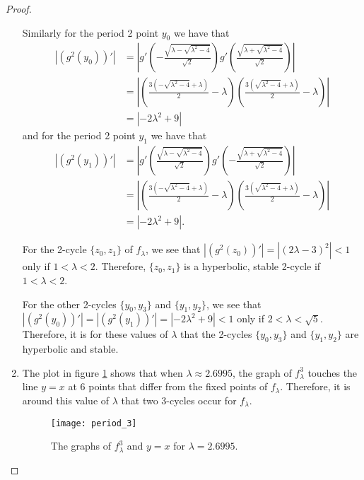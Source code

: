 \begin{proof}
\begin{enumerate}
      Similarly for the period 2 point $y_0$ we have that
      \begin{align*}
        \left|(g^2(y_0))'\right| &= \left|g'\left(-\frac{\sqrt{\lambda - \sqrt{\lambda^2-4}}}{\sqrt{2}}\right)g'\left(\frac{\sqrt{\lambda + \sqrt{\lambda^2-4}}}{\sqrt{2}}\right)\right| \\
        &= \left|\left(\frac{3\left(-\sqrt{\lambda^2 - 4} + \lambda\right)}{2}  - \lambda\right)\left(\frac{3\left(\sqrt{\lambda^2 - 4} + \lambda\right)}{2}  - \lambda\right)\right| \\
        &= \left|-2\lambda^2+9\right|
      \end{align*}
      and for the period 2 point $y_1$ we have that
      \begin{align*}
        \left|(g^2(y_1))'\right| &= \left|g'\left(\frac{\sqrt{\lambda - \sqrt{\lambda^2-4}}}{\sqrt{2}}\right)g'\left(-\frac{\sqrt{\lambda + \sqrt{\lambda^2-4}}}{\sqrt{2}}\right)\right| \\
        &= \left|\left(\frac{3\left(-\sqrt{\lambda^2 - 4} + \lambda\right)}{2}  - \lambda\right)\left(\frac{3\left(\sqrt{\lambda^2 - 4} + \lambda\right)}{2}  - \lambda\right)\right| \\
        &= \left|-2\lambda^2+9\right|.
      \end{align*}

      For the 2-cycle $\{z_0, z_1\}$ of $f_\lambda$,
      we see that $\left|(g^2(z_0))'\right| = \left|(2\lambda - 3)^2\right| < 1$ only if $1 < \lambda < 2$. Therefore, $\{z_0, z_1\}$
      is a hyperbolic, stable 2-cycle if $1 < \lambda < 2$.

      For the other 2-cycles $\{y_0, y_3\}$ and $\{y_1, y_2\}$, we see that
      $\left|(g^2(y_0))'\right| = \left|(g^2(y_1))'\right| = \left|-2\lambda^2 + 9\right| < 1$ only if
      $2 < \lambda < \sqrt{5}$. Therefore, it is for these values of
      $\lambda$ that the 2-cycles $\{y_0, y_3\}$ and $\{y_1, y_2\}$ are hyperbolic and stable.
    \item The plot in figure \ref{per3} shows that when $\lambda \approx 2.6995$, the graph
      of $f_\lambda^3$ touches the line $y=x$ at 6 points that differ from the fixed points of $f_\lambda$. Therefore,
      it is around this value of $\lambda$ that two 3-cycles occur for $f_\lambda$.
      \begin{figure}[!h]
        \centering
        \centerline{\texttt{[image: period\_3]}}
        \caption{The graphs of $f_\lambda^3$ and $y=x$ for $\lambda= 2.6995$.}
        \label{per3}
      \end{figure}
  \end{enumerate}
\end{proof}
\newpage
